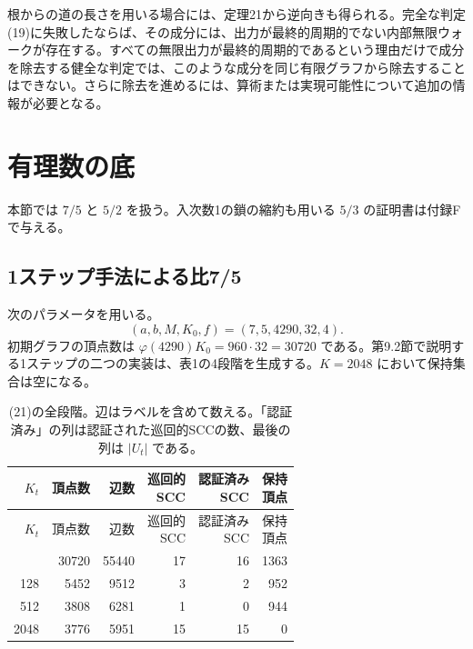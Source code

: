 \documentclass[11pt,reqno]{amsart}
\theoremstyle{definition}
\theoremstyle{definition}
\theoremstyle{remark}
\begin{document}
根からの道の長さを用いる場合には、定理21から逆向きも得られる。完全な判定(19)に失敗したならば、その成分には、出力が最終的周期的でない内部無限ウォークが存在する。すべての無限出力が最終的周期的であるという理由だけで成分を除去する健全な判定では、このような成分を同じ有限グラフから除去することはできない。さらに除去を進めるには、算術または実現可能性について追加の情報が必要となる。

\section{有理数の底}\label{sec:5}

本節では \(7/5\) と \(5/2\) を扱う。入次数1の鎖の縮約も用いる \(5/3\) の証明書は付録Fで与える。

\subsection{1ステップ手法による比7/5}\label{sec:5.1}

次のパラメータを用いる。
\[
(a,b,M,K_0,f)=(7,5,4290,32,4).
\tag{21}\label{eq:21}
\]
初期グラフの頂点数は \(\varphi(4290)K_0=960\cdot32=30720\) である。第9.2節で説明する1ステップの二つの実装は、表1の4段階を生成する。\(K=2048\) において保持集合は空になる。


\begingroup
\small
\setlength{\tabcolsep}{4pt}
\renewcommand{\arraystretch}{1.15}
\setlength{\LTcapwidth}{\textwidth}
\begin{longtable}{@{} r r r r r r@{}}
\caption{(21)の全段階。辺はラベルを含めて数える。「認証済み」の列は認証された巡回的SCCの数、最後の列は \(|U_t|\) である。}\label{tab:1}\\
\toprule
\(K_t\) & 頂点数 & 辺数 & \shortstack[r]{巡回的\\SCC} & \shortstack[r]{認証済み\\SCC} & \shortstack[r]{保持\\頂点} \\
\midrule
\endfirsthead
\toprule
\(K_t\) & 頂点数 & 辺数 & \shortstack[r]{巡回的\\SCC} & \shortstack[r]{認証済み\\SCC} & \shortstack[r]{保持\\頂点} \\
\midrule
\endhead
\bottomrule
\endlastfoot
32 & 30720 & 55440 & 17 & 16 & 1363 \\*
128 & 5452 & 9512 & 3 & 2 & 952 \\*
512 & 3808 & 6281 & 1 & 0 & 944 \\*
2048 & 3776 & 5951 & 15 & 15 & 0 \\
\end{longtable}
\endgroup
\end{document}
